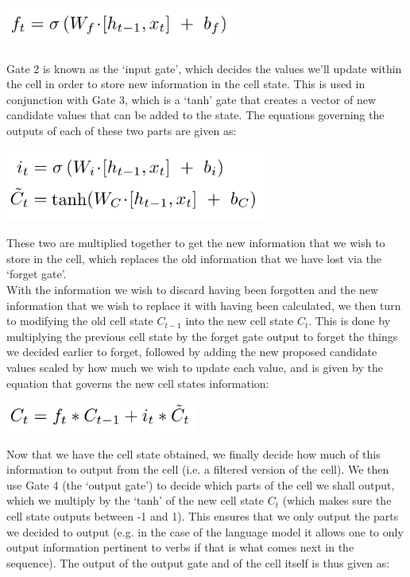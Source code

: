 \documentclass[12pt,twoside]{report}
\begin{document}
\begin{center}
\includegraphics[scale=0.7]{project_figures/fig3_8}
\end{center}

\quad Gate 2 is known as the ‘input gate’, which decides the values we’ll update within the cell in order to store new information in the cell state. This is used in conjunction with Gate 3, which is a ‘tanh’ gate that creates a vector of new candidate values that can be added to the state. The equations governing the outputs of each of these two parts are given as:\\

\begin{center}
\includegraphics[scale=0.7]{project_figures/fig3_9}
\end{center}

\quad These two are multiplied together to get the new information that we wish to store in the cell, which replaces the old information that we have lost via the ‘forget gate’.\\

\quad With the information we wish to discard having been forgotten and the new information that we wish to replace it with having been calculated, we then turn to modifying the old cell state $C_{t-1}$ into the new cell state $C_t$. This is done by multiplying the previous cell state by the forget gate output to forget the things we decided earlier to forget, followed by adding the new proposed candidate values scaled by how much we wish to update each value, and is given by the equation that governs the new cell states information:\\

\begin{center}
\includegraphics[scale=0.7]{project_figures/fig3_10}
\end{center}

\quad Now that we have the cell state obtained, we finally decide how much of this information to output from the cell (i.e. a filtered version of the cell). We then use Gate 4 (the ‘output gate’) to decide which parts of the cell we shall output, which we multiply by the ‘tanh’ of the new cell state $C_t$ (which makes sure the cell state outputs between -1 and 1). This ensures that we only output the parts we decided to output (e.g. in the case of the language model it allows one to only output information pertinent to verbs if that is what comes next in the sequence). The output of the output gate and of the cell itself is thus given as:\\
\end{document}
